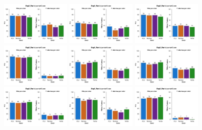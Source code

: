 \documentclass[a4paper ]{article}
\begin{document}
\begin{figure}[th]
\includegraphics[width=0.3\textwidth]{Figures/Color_Exp2_P10} \includegraphics[width=0.3\textwidth]{Figures/Color_Exp2_P11} \includegraphics[width=0.3\textwidth]{Figures/Color_Exp2_P12}
\includegraphics[width=0.3\textwidth]{Figures/Color_Exp2_P13} \includegraphics[width=0.3\textwidth]{Figures/Color_Exp2_P14} \includegraphics[width=0.3\textwidth]{Figures/Color_Exp2_P15}
\includegraphics[width=0.3\textwidth]{Figures/Color_Exp2_P16} \includegraphics[width=0.3\textwidth]{Figures/Color_Exp2_P17} \includegraphics[width=0.3\textwidth]{Figures/Color_Exp2_P18}

\end{figure}
\end{document}
